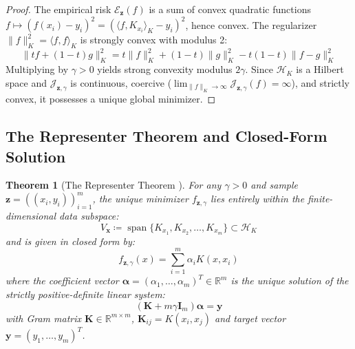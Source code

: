 \documentclass[11pt,a4paper]{article}
\newtheorem{theorem}{Theorem}[section]
\theoremstyle{definition}
\begin{document}
\begin{proof}
The empirical risk $\mathcal{E}_{\mathbf{z}}(f)$ is a sum of convex quadratic functions $f \mapsto (f(x_i) - y_i)^2 = (\langle f, K_{x_i} \rangle_K - y_i)^2$, hence convex.
The regularizer $\|f\|_K^2 = \langle f, f \rangle_K$ is strongly convex with modulus 2:
\[
\|t f + (1-t) g\|_K^2 = t \|f\|_K^2 + (1-t) \|g\|_K^2 - t(1-t) \|f - g\|_K^2
\]
Multiplying by $\gamma > 0$ yields strong convexity modulus $2\gamma$.
Since $\mathcal{H}_K$ is a Hilbert space and $\mathcal{J}_{\mathbf{z}, \gamma}$ is continuous, coercive ($\lim_{\|f\|_K \to \infty} \mathcal{J}_{\mathbf{z}, \gamma}(f) = \infty$), and strictly convex, it possesses a unique global minimizer.
\end{proof}

\subsection{The Representer Theorem and Closed-Form Solution}

\begin{theorem}[The Representer Theorem \cite{cucker2002, scholkopf2001}]\label{thm:representer}
For any $\gamma > 0$ and sample $\mathbf{z} = ((x_i, y_i))_{i=1}^m$, the unique minimizer $f_{\mathbf{z}, \gamma}$ lies entirely within the finite-dimensional data subspace:
\begin{equation}\label{eq:span_subspace}
V_{\mathbf{x}} \coloneqq \operatorname{span}\{ K_{x_1}, K_{x_2}, \dots, K_{x_m} \} \subset \mathcal{H}_K
\end{equation}
and is given in closed form by:
\begin{equation}\label{eq:representer_formula}
f_{\mathbf{z}, \gamma}(x) = \sum_{i=1}^m \alpha_i K(x, x_i)
\end{equation}
where the coefficient vector $\boldsymbol{\alpha} = (\alpha_1, \dots, \alpha_m)^T \in \mathbb{R}^m$ is the unique solution of the strictly positive-definite linear system:
\begin{equation}\label{eq:kernel_linear_system}
(\mathbf{K} + m \gamma \mathbf{I}_m) \boldsymbol{\alpha} = \mathbf{y}
\end{equation}
with Gram matrix $\mathbf{K} \in \mathbb{R}^{m \times m}$, $\mathbf{K}_{ij} = K(x_i, x_j)$ and target vector $\mathbf{y} = (y_1, \dots, y_m)^T$.
\end{theorem}
\end{document}
